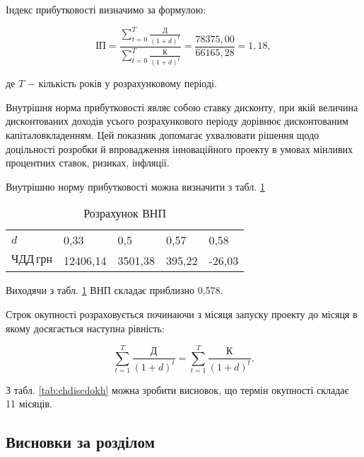 Індекс прибутковості визначимо за формулою:

\begin{equation}\label{eq:economy15}
	\text{ІП} = \frac{\sum_{t=0}^{T}\frac{\text{Д}}{(1 + d)^{t}}}{\sum_{t=0}^{T}\frac{\text{К}}{(1 + d)^{t}}} = \frac{78375,00}{66165,28} = 1,18,
\end{equation}

\noindent де $T$ $-$ кількість років у розрахунковому періоді.

\vspace{1.5em}

Внутрішня норма прибутковості являє собою ставку дисконту, при якій величина дисконтованих доходів усього розрахункового періоду дорівнює дисконтованим капіталовкладенням. Цей показник допомагає ухвалювати рішення щодо доцільності розробки й впровадження інноваційного проекту в умовах мінливих процентних ставок, ризиках, інфляції.

Внутрішню норму прибутковості можна визначити з табл. \ref{tab:vnp}

\begin{table}[h!]
	\captionstyle{ \raggedright}
	\caption{Розрахунок ВНП}\label{tab:vnp}
	\begin{tabular}{| p{} | p{} | p{} | p{} | p{} |}
		\hline
		$d$ & 0,33 & 0,5 & 0,57 & 0,58 \\
		\hlinewd{2pt}
		$\text{ЧДД} \, \text{грн}$ & 12406,14 & 3501,38 & 395,22 & -26,03 \\
		\hline
	\end{tabular}
\end{table}

Виходячи з табл. \ref{tab:vnp} ВНП складає приблизно 0,578.

Строк окупності розраховується починаючи з місяця запуску проекту до місяця в якому досягається наступна рівність:

\begin{equation}\label{eq:economy16}
	\sum_{t=1}^{T}\frac{\text{Д}}{(1 + d)^{t}} = \sum_{t=1}^{T}\frac{\text{К}}{(1 + d)^{t}}.
\end{equation}

\vspace{1.5em}

З табл. \ref{tab:chdiscdokh} можна зробити висновок, що термін окупності складає 11 місяців.

\subsection{Висновки за розділом}

